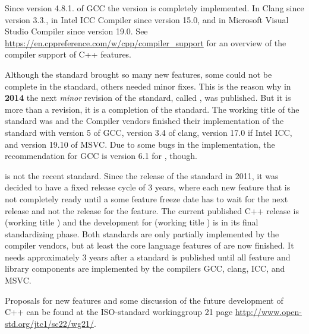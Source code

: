 Since version 4.8.1. of GCC the  version is completely implemented. In Clang since version 3.3., in Intel ICC Compiler since version 15.0,
and in Microsoft Visual Studio Compiler since version 19.0. See \url{https://en.cppreference.com/w/cpp/compiler_support} for an overview of
the compiler support of C++ features.

Although the  standard brought so many new features, some could not be complete in the standard, others needed minor fixes. This is the reason
why in \textbf{2014} the next \emph{minor} revision of the standard, called , was published. But it is more than a revision, it is a completion
of the  standard. The working title of the standard was  and the Compiler vendors finished their implementation of the standard
with version 5 of GCC, version 3.4 of clang, version 17.0 if Intel ICC, and version 19.10 of MSVC. Due to some bugs in the implementation,
the recommendation for GCC is version 6.1 for , though.

 is not the recent standard. Since the release of the  standard in 2011, it was decided to have a fixed release cycle of 3 years,
where each new feature that is not completely ready until a some feature freeze date has to wait for the next release and not the release for the feature.
The current published C++ release is  (working title ) and the development for  (working title ) is in its
final standardizing phase. Both standards are only partially implemented by the compiler vendors, but at least the core language features
of  are now finished. It needs approximately 3 years after a standard is published until all feature and library components are
implemented by the compilers GCC, clang, ICC, and MSVC.

Proposals for new features and some discussion of the future development of C++ can be found at the ISO-standard workinggroup 21 page
\url{http://www.open-std.org/jtc1/sc22/wg21/}.
